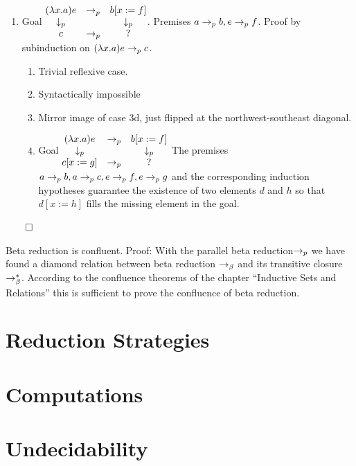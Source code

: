 \documentclass{article}
\begin{document}
\begin{theorem}
\begin{enumerate}
  \item
    Goal $\begin{matrix} (\lambda x.a) e & \to_p & b[x:=f] \\ \downarrow_p & & \downarrow_p \\ c & \to_p & ? \end{matrix}$. Premises $a \to_{p} b, e \to_{p} f$.
    Proof by subinduction on $(\lambda x.a) e \to_{p} c$.
    \begin{enumerate}
    \item Trivial reflexive case.
    \item Syntactically impossible
    \item Mirror image of case 3d, just flipped at the northwest-southeast diagonal.
    \item
      Goal $\begin{matrix} (\lambda x.a) e & \to_p & b[x:=f] \\ \downarrow_p & & \downarrow_p \\ c[x:=g] & \to_p & ? \end{matrix}$
      The premises $a \to_{p} b, a \to_{p} c, e \to_{p} f, e \to_{p} g$
      and the corresponding induction hypotheses guarantee the existence of
      two elements $d$ and $h$ so that $d[x:=h]$ fills the missing element
      in the goal.
    \end{enumerate}

  \end{enumerate}
  $\qed$
\end{theorem}


\begin{theorem}
  Beta reduction is confluent.
  Proof: With the parallel beta reduction$\to_{p}$ we have found a diamond
  relation between beta reduction $\to_\beta$ and its transitive closure
  $\to^*_\beta$. According to the confluence theorems of the chapter
  ``Inductive Sets and Relations'' this is sufficient to prove the confluence
  of beta reduction.
\end{theorem}

\section{Reduction Strategies}

\section{Computations}

\section{Undecidability}



\end{document}

